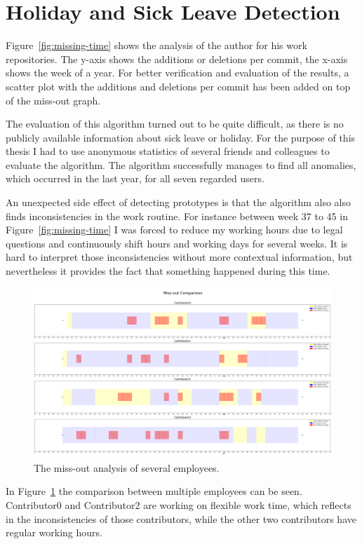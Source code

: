 \section{Holiday and Sick Leave Detection}

Figure~\ref{fig:missing-time} shows the analysis of the author for his work repositories.
The y-axis shows the additions or deletions per commit, the x-axis shows the week of a year.
For better verification and evaluation of the results, a scatter plot with the additions and deletions per commit has been added on top of the miss-out graph.

The evaluation of this algorithm turned out to be quite difficult, as there is no publicly available information about sick leave or holiday.
For the purpose of this thesis I had to use anonymous statistics of several friends and colleagues to evaluate the algorithm.
The algorithm successfully manages to find all anomalies, which occurred in the last year, for all seven regarded users.

An unexpected side effect of detecting prototypes is that the algorithm also also finds inconsistencies in the work routine.
For instance between week 37 to 45 in Figure~\ref{fig:missing-time} I was forced to reduce my working hours due to legal questions and continuously shift hours and working days for several weeks.
It is hard to interpret those inconsistencies without more contextual information, but nevertheless it provides the fact that something happened during this time.

\begin{figure}[H]
    \includegraphics[scale=0.20]{./graphs/analysis/work-time-analysis-comparison}
    \centering
    \caption{The miss-out analysis of several employees.}\label{fig:miss-out-comparison}
\end{figure}

In Figure~\ref{fig:miss-out-comparison} the comparison between multiple employees can be seen.
Contributor0 and Contributor2 are working on flexible work time, which reflects in the inconsistencies of those contributors, while the other two contributors have regular working hours.
